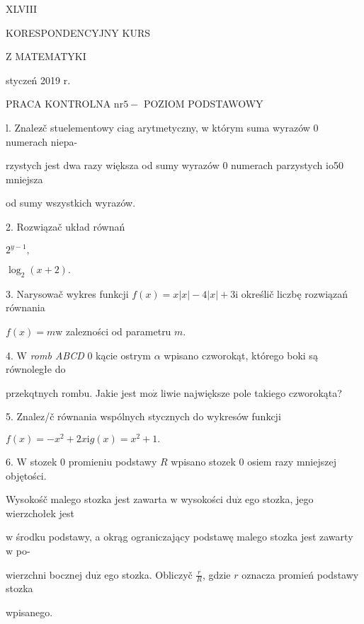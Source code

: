 \documentclass[a4paper,12pt]{article}
\begin{document}
XLVIII

KORESPONDENCYJNY KURS

Z MATEMATYKI

styczeń 2019 r.

PRACA KONTROLNA $\mathrm{n}\mathrm{r} 5-$ POZIOM PODSTAWOWY

l. Znalez$\acute{}$č stuelementowy ciag arytmetyczny, w którym suma wyrazów 0 numerach niepa-

rzystych jest dwa razy większa od sumy wyrazów 0 numerach parzystych io50 mniejsza

od sumy wszystkich wyrazów.

2. Rozwiązač układ równań 

$2^{y-1},$

$\log_{2}(x+2).$

3. Narysowač wykres funkcji $f(x) =x|x|-4|x|+3\mathrm{i}$ określič liczbę rozwiązań równania

$f(x)=m\mathrm{w}$ zalezności od parametru $m.$

4. $\mathrm{W}$ {\it romb ABCD} $0$ kącie ostrym $\alpha$ wpisano czworokąt, którego boki są równoległe do

przekqtnych rombu. Jakie jest $\mathrm{m}\mathrm{o}\dot{\mathrm{z}}$ liwie największe pole takiego czworokąta?

5. Znalez/č równania wspólnych stycznych do wykresów funkcji

$f(x)=-x^{2}+2x\mathrm{i}g(x)=x^{2}+1.$

6. $\mathrm{W}$ stozek $0$ promieniu podstawy $R$ wpisano stozek $0$ osiem razy mniejszej objętości.

Wysokośč malego stozka jest zawarta $\mathrm{w}$ wysokości $\mathrm{d}\mathrm{u}\dot{\mathrm{z}}$ ego stozka, jego wierzchołek jest

$\mathrm{w}$ środku podstawy, a okrąg ograniczający podstawę malego stozka jest zawarty $\mathrm{w}$ po-

wierzchni bocznej $\mathrm{d}\mathrm{u}\dot{\mathrm{z}}$ ego stozka. Obliczyč $\displaystyle \frac{r}{R}$, gdzie $r$ oznacza promień podstawy stozka

wpisanego.
\end{document}
